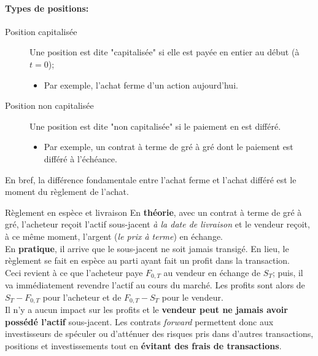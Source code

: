 \documentclass[10pt, french]{article}
\begin{document}
\begin{multicols*}{2}
\paragraph{Types de positions:}
\begin{description}
	\item[Position capitalisée]	Une position est dite "capitalisée" si elle est payée en entier au début (à $t = 0$);
		\begin{itemize}[leftmargin = *]
		\item	Par exemple, l'achat ferme d'un action aujourd'hui.
		\end{itemize}
	\item[Position non capitalisée]	Une position est dite "non capitalisée" si le paiement en est différé.
		\begin{itemize}[leftmargin = *]
		\item	Par exemple, un contrat à terme de gré à gré dont le paiement est différé à l'échéance.
		\end{itemize}
\end{description}

En bref, la différence fondamentale entre l'achat ferme et l'achat différé est le moment du règlement de l'achat.\\

\begin{conceptgen}{Règlement en espèce et livraison}
En \textbf{théorie}, avec un contrat à terme de gré à gré, l'acheteur reçoit l'actif sous-jacent \textit{à la date de livraison} et le vendeur reçoit, à ce même moment, l'argent (\textit{le prix à terme}) en échange.\\

En \textbf{pratique}, il arrive que le sous-jacent ne soit jamais transigé. En lieu, le règlement se fait en espèce au parti ayant fait un profit dans la transaction.\\

Ceci revient à ce que l'acheteur paye $F_{0, T}$ au vendeur en échange de $S_{T}$; puis, il va immédiatement revendre l'actif au cours du marché. Les profits sont alors de $S_{T} - F_{0, T}$ pour l'acheteur et de $F_{0, T} - S_{T}$ pour le vendeur.\\

Il n'y a aucun impact sur les profits et le \textbf{vendeur peut ne jamais avoir possédé l'actif} sous-jacent. Les contrats \og \textit{forward} \fg{} permettent donc aux investisseurs de spéculer ou d'atténuer des risques pris dans d'autres transactions, positions et investissements tout en \textbf{évitant des frais de transactions}.
\end{conceptgen}
\end{multicols*}
\newpage
\end{document}
